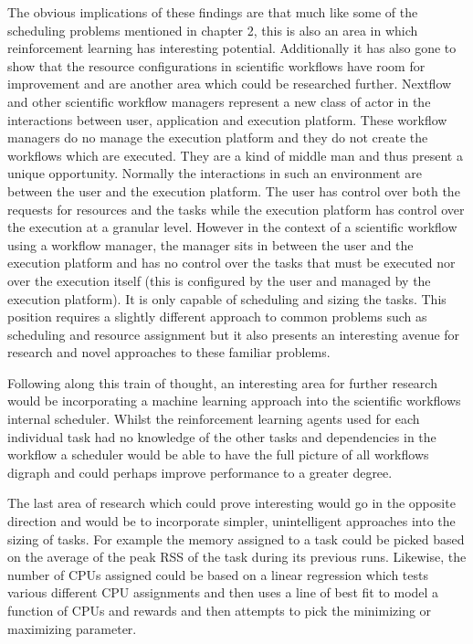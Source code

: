 The obvious implications of these findings are that much like some of the scheduling problems mentioned in chapter 2, this is also an area in which reinforcement learning has interesting potential. Additionally it has also gone to show that the resource configurations in scientific workflows have room for improvement and are another area which could be researched further. Nextflow and other scientific workflow managers represent a new class of actor in the interactions between user, application and execution platform. These workflow managers do no manage the execution platform and they do not create the workflows which are executed. They are a kind of middle man and thus present a unique opportunity. Normally the interactions in such an environment are between the user and the execution platform. The user has control over both the requests for resources and the tasks while the execution platform has control over the execution at a granular level. However in the context of a scientific workflow using a workflow manager, the manager sits in between the user and the execution platform and has no control over the tasks that must be executed nor over the execution itself (this is configured by the user and managed by the execution platform). It is only capable of scheduling and sizing the tasks. This position requires a slightly different approach to common problems such as scheduling and resource assignment but it also presents an interesting avenue for research and novel approaches to these familiar problems.

Following along this train of thought, an interesting area for further research would be incorporating a machine learning approach into the scientific workflows internal scheduler. Whilst the reinforcement learning agents used for each individual task had no knowledge of the other tasks and dependencies in the workflow a scheduler would be able to have the full picture of all workflows digraph and could perhaps improve performance to a greater degree. 

The last area of research which could prove interesting would go in the opposite direction and would be to incorporate simpler, unintelligent approaches into the sizing of tasks. For example the memory assigned to a task could be picked based on the average of the peak RSS of the task during its previous runs. Likewise, the number of CPUs assigned could be based on a linear regression which tests various different CPU assignments and then uses a line of best fit to model a function of CPUs and rewards and then attempts to pick the minimizing or maximizing parameter.

